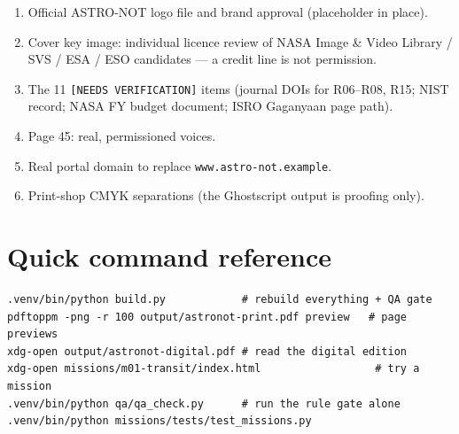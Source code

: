 \documentclass[11pt,a4paper]{article}
\newcommand{\code}[1]{\texttt{#1}}
\begin{document}
\begin{enumerate}[leftmargin=6mm,itemsep=1pt]
  \item Official ASTRO-NOT logo file and brand approval (placeholder in place).
  \item Cover key image: individual licence review of NASA Image \& Video
        Library / SVS / ESA / ESO candidates --- a credit line is not
        permission.
  \item The 11 \texttt{[NEEDS VERIFICATION]} items (journal DOIs for R06--R08,
        R15; NIST record; NASA FY budget document; ISRO Gaganyaan page path).
  \item Page 45: real, permissioned voices.
  \item Real portal domain to replace \code{www.astro-not.example}.
  \item Print-shop CMYK separations (the Ghostscript output is proofing only).
\end{enumerate}

\section*{Quick command reference}
\begin{lstlisting}
.venv/bin/python build.py            # rebuild everything + QA gate
pdftoppm -png -r 100 output/astronot-print.pdf preview   # page previews
xdg-open output/astronot-digital.pdf # read the digital edition
xdg-open missions/m01-transit/index.html                  # try a mission
.venv/bin/python qa/qa_check.py      # run the rule gate alone
.venv/bin/python missions/tests/test_missions.py
\end{lstlisting}
\end{document}
